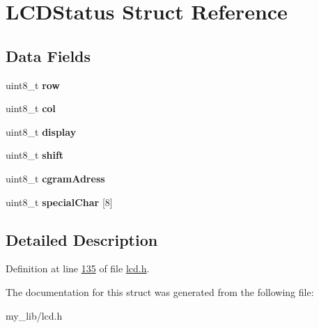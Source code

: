 \hypertarget{struct_l_c_d_status}{\section{L\-C\-D\-Status Struct Reference}
\label{struct_l_c_d_status}
}
\subsection*{Data Fields}
\begin{DoxyCompactItemize}
\item 
\hypertarget{struct_l_c_d_status_a1032713b3106af056748cc1766bbf67f}{uint8\-\_\-t {\bfseries row}}\label{struct_l_c_d_status_a1032713b3106af056748cc1766bbf67f}

\item 
\hypertarget{struct_l_c_d_status_a79a5d5cb370566c8638d9a3866ff8e6b}{uint8\-\_\-t {\bfseries col}}\label{struct_l_c_d_status_a79a5d5cb370566c8638d9a3866ff8e6b}

\item 
\hypertarget{struct_l_c_d_status_a844c7ce7851d43e9459d28c2e93d715a}{uint8\-\_\-t {\bfseries display}}\label{struct_l_c_d_status_a844c7ce7851d43e9459d28c2e93d715a}

\item 
\hypertarget{struct_l_c_d_status_ad69f767818d8a15e1fd6935e07df3770}{uint8\-\_\-t {\bfseries shift}}\label{struct_l_c_d_status_ad69f767818d8a15e1fd6935e07df3770}

\item 
\hypertarget{struct_l_c_d_status_a896d1656ee60acf6ad7bcce2cdf3edae}{uint8\-\_\-t {\bfseries cgram\-Adress}}\label{struct_l_c_d_status_a896d1656ee60acf6ad7bcce2cdf3edae}

\item 
\hypertarget{struct_l_c_d_status_a8a1571d6288e2ec1ed1114fca2f873be}{uint8\-\_\-t {\bfseries special\-Char} \mbox{[}8\mbox{]}}\label{struct_l_c_d_status_a8a1571d6288e2ec1ed1114fca2f873be}

\end{DoxyCompactItemize}


\subsection{Detailed Description}


Definition at line \hyperlink{lcd_8h_source_l00135}{135} of file \hyperlink{lcd_8h_source}{lcd.\-h}.



The documentation for this struct was generated from the following file\-:\begin{DoxyCompactItemize}
\item 
my\-\_\-lib/lcd.\-h\end{DoxyCompactItemize}
